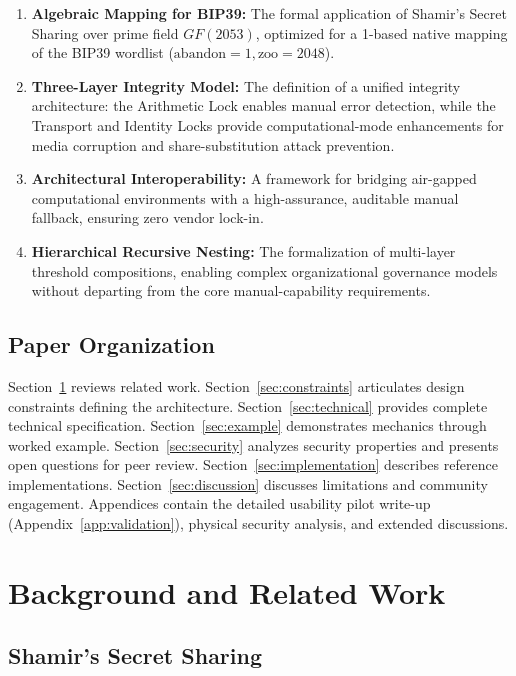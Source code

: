 \documentclass[11pt]{article}
\begin{document}
\begin{enumerate}[noitemsep]
    \item \textbf{Algebraic Mapping for BIP39:} The formal application of Shamir's Secret Sharing over prime field $GF(2053)$, optimized for a 1-based native mapping of the BIP39 wordlist ($\text{abandon} = 1, \text{zoo} = 2048$).
    \item \textbf{Three-Layer Integrity Model:} The definition of a unified integrity architecture: the Arithmetic Lock enables manual error detection, while the Transport and Identity Locks provide computational-mode enhancements for media corruption and share-substitution attack prevention.
    \item \textbf{Architectural Interoperability:} A framework for bridging air-gapped computational environments with a high-assurance, auditable manual fallback, ensuring zero vendor lock-in.
    \item \textbf{Hierarchical Recursive Nesting:} The formalization of multi-layer threshold compositions, enabling complex organizational governance models without departing from the core manual-capability requirements.
\end{enumerate}

\subsection{Paper Organization}

Section~\ref{sec:background} reviews related work. Section~\ref{sec:constraints} articulates design constraints defining the architecture. Section~\ref{sec:technical} provides complete technical specification. Section~\ref{sec:example} demonstrates mechanics through worked example. Section~\ref{sec:security} analyzes security properties and presents open questions for peer review. Section~\ref{sec:implementation} describes reference implementations. Section~\ref{sec:discussion} discusses limitations and community engagement. Appendices contain the detailed usability pilot write-up (Appendix~\ref{app:validation}), physical security analysis, and extended discussions.

\section{Background and Related Work}
\label{sec:background}

\subsection{Shamir's Secret Sharing}
\end{document}
